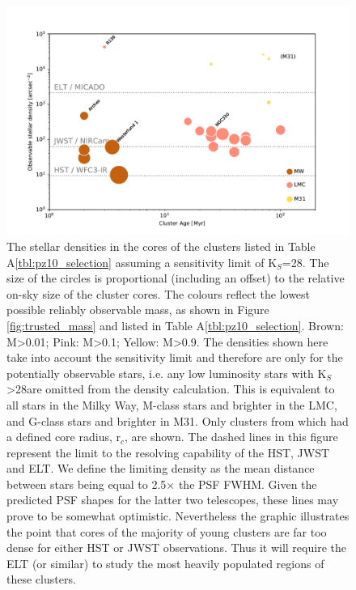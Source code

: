 \begin{figure}

    \centering
    \includegraphics[width=\textwidth]{images/star_density_vs_age}

    \caption{The stellar densities in the cores of the clusters listed in Table A\ref{tbl:pz10_selection} assuming a sensitivity limit of K$_S$=28\m. The size of the circles is proportional (including an offset) to the relative on-sky size of the cluster cores. The colours reflect the lowest possible reliably observable mass, as shown in Figure \ref{fig:trusted_mass} and listed in Table A\ref{tbl:pz10_selection}. Brown: M\textgreater0.01\msun; Pink: M\textgreater0.1\msun; Yellow: M\textgreater0.9\msun. The densities shown here take into account the sensitivity limit and therefore are only for the potentially observable stars, i.e. any low luminosity stars with K$_S$\textgreater28\m are omitted from the density calculation. This is equivalent to all stars in the Milky Way, M-class stars and brighter in the LMC, and G-class stars and brighter in M31. Only clusters from \citet{portegies2010} which had a defined core radius, r$_c$, are shown.  The dashed lines in this figure represent the limit to the resolving capability of the HST, JWST and ELT. We define the limiting density as the mean distance between stars being equal to 2.5$\times$ the PSF FWHM. Given the predicted PSF shapes for the latter two telescopes, these lines may prove to be somewhat optimistic. Nevertheless the graphic illustrates the point that cores of the majority of young clusters are far too dense for either HST or JWST observations. Thus it will require the ELT (or similar) to study the most heavily populated regions of these clusters.}
    
    \label{fig:star_density_vs_age}
    
\end{figure}



